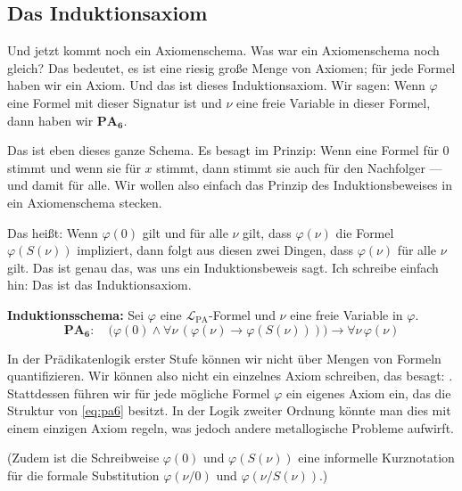 \subsection{Das Induktionsaxiom}

\begin{spoken-clean}[00:11:00 - 00:13:28]
Und jetzt kommt noch ein Axiomenschema. Was war ein Axiomenschema noch gleich? Das bedeutet, es ist eine riesig große Menge von Axiomen; für jede Formel haben wir ein Axiom. Und das ist dieses Induktionsaxiom. Wir sagen: Wenn $\varphi$ eine Formel mit dieser Signatur ist und $\nu$ eine freie Variable in dieser Formel, dann haben wir $\mathbf{PA_6}$.

Das ist eben dieses ganze Schema. Es besagt im Prinzip: Wenn eine Formel für $0$ stimmt und wenn sie für $x$ stimmt, dann stimmt sie auch für den Nachfolger --- und damit für alle. Wir wollen also einfach das Prinzip des Induktionsbeweises in ein Axiomenschema stecken.

Das heißt: Wenn $\varphi(0)$ gilt und für alle $\nu$ gilt, dass $\varphi(\nu)$ die Formel $\varphi(S(\nu))$ impliziert, dann folgt aus diesen zwei Dingen, dass $\varphi(\nu)$ für alle $\nu$ gilt. Das ist genau das, was uns ein Induktionsbeweis sagt. Ich schreibe einfach hin: Das ist das Induktionsaxiom.
\end{spoken-clean}

\begin{math-stroke}[Induktionsschema]
\textbf{Induktionsschema:}
Sei $\varphi$ eine $\mathcal{L}_{\text{PA}}$-Formel und $\nu$ eine freie Variable in $\varphi$.
\begin{equation}
\label{eq:pa6}
\mathbf{PA_6}\colon \quad \bigl( \varphi(0) \land \forall \nu \, (\varphi(\nu) \to \varphi(S(\nu))) \bigr) \to \forall \nu \, \varphi(\nu)
\end{equation}

\begin{explanation-of-steps}
In der Prädikatenlogik erster Stufe können wir nicht über Mengen von Formeln quantifizieren. Wir können also nicht ein einzelnes Axiom schreiben, das besagt: . Stattdessen führen wir für jede mögliche Formel $\varphi$ ein eigenes Axiom ein, das die Struktur von \eqref{eq:pa6} besitzt. In der Logik zweiter Ordnung könnte man dies mit einem einzigen Axiom regeln, was jedoch andere metallogische Probleme aufwirft.

(Zudem ist die Schreibweise $\varphi(0)$ und $\varphi(S(\nu))$ eine informelle Kurznotation für die formale Substitution $\varphi(\nu/0)$ und $\varphi(\nu/S(\nu))$.)
\end{explanation-of-steps}
\end{math-stroke}

